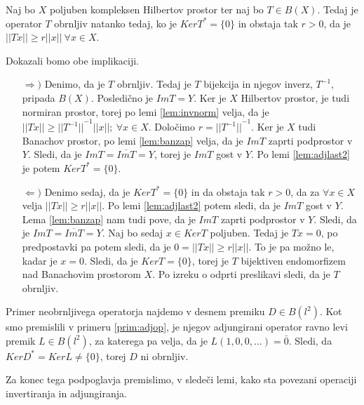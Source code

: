 \documentclass[mat2]{matdelo}
\newcommand{\abs}[1]{\ensuremath{\lvert #1 \rvert}}
\newcommand{\norm}[1]{\abs{\abs{#1}}}
\begin{document}
			\begin{posledica}
				\label{posl:adjinv}
				Naj bo $X$ poljuben kompleksen Hilbertov prostor ter naj bo $T\in B(X)$. Tedaj je operator $T$ obrnljiv natanko tedaj, ko je $KerT^* = \{0\}$ in obstaja tak $r > 0$, da je $\norm{Tx} \geq r\norm{x}~\forall x\in X$.
			\end{posledica}
			
			\begin{dokaz}
				Dokazali bomo obe implikaciji.
				\begin{itemize}
					\item[$\Rightarrow)$] Denimo, da je $T$ obrnljiv. Tedaj je $T$ bijekcija in njegov inverz, $T^{-1}$, pripada $B(X)$. Posledično je $ImT = Y$. Ker je $X$ Hilbertov prostor, je tudi normiran prostor, torej po lemi \ref{lem:invnorm} velja, da je $\norm{Tx}\geq \norm{T^{-1}}^{-1}\norm{x};~\forall x\in X$. Določimo $r = \norm{T^{-1}}^{-1}$. Ker je $X$ tudi Banachov prostor, po lemi \ref{lem:banzap} velja, da je $ImT$ zaprti podprostor v $Y$. Sledi, da je $ImT = \overline{ImT} = Y$, torej je $ImT$ gost v $Y$. Po lemi \ref{lem:adjlast2} je potem $KerT^* = \{0\}$.
					\item[$\Leftarrow)$] Denimo sedaj, da je $KerT^* = \{0\}$ in da obstaja tak $r>0$, da za $\forall x\in X$ velja $\norm{Tx} \geq r\norm{x}$. Po lemi \ref{lem:adjlast2} potem sledi, da je $ImT$ gost v $Y$. Lema \ref{lem:banzap} nam tudi pove, da je $ImT$ zaprti podprostor v $Y$. Sledi, da je $ImT = \overline{ImT} = Y$.
					Naj bo sedaj $x\in KerT$ poljuben. Tedaj je $Tx = 0$, po predpostavki pa potem sledi, da je $0 = \norm{Tx} \geq r\norm{x}$. To je pa možno le, kadar je $x = 0$. Sledi, da je $KerT = \{0\}$, torej je $T$ bijektiven endomorfizem nad Banachovim prostorom $X$. Po izreku o odprti preslikavi sledi, da je $T$ obrnljiv.
				\end{itemize}
			\end{dokaz}
			
			\begin{primer}
				\label{prim:adjinv}
				Primer neobrnljivega operatorja najdemo v desnem premiku $D\in B(l^2)$. Kot smo premislili v primeru \ref{prim:adjop}, je njegov adjungirani operator ravno levi premik $L\in B(l^2)$, za katerega pa velja, da je $L(1, 0, 0, \ldots) = \bar{0}$. Sledi, da $KerD^* = KerL \neq \{0\}$, torej $D$ ni obrnljiv.
			\end{primer}
			
			Za konec tega podpoglavja premislimo, v sledeči lemi, kako sta povezani operaciji invertiranja in adjungiranja.
			
\end{document}
